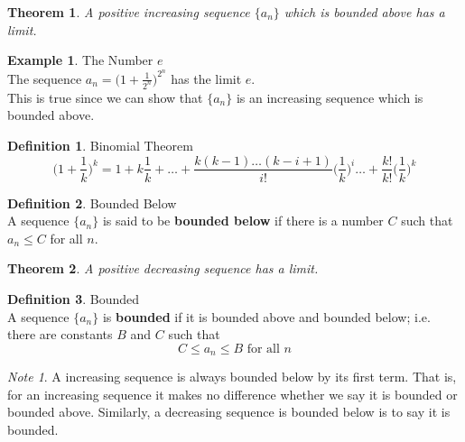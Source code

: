 \documentclass[10pt,a4paper,titlepage,twoside,draft]{article}
\theoremstyle{plain}
\newtheorem{thm}{Theorem}
\theoremstyle{definition}
\newtheorem{defn}{Definition}
\newtheorem{exmp}{Example}
\theoremstyle{remark}
\newtheorem{nt}{Note}
\begin{document}
\medskip

\begin{thm}
A positive increasing sequence $\{ a_{n} \}$ which is bounded above has a limit.
\end{thm}

\medskip

\begin{exmp}{The Number $e$} \\
The sequence $a_{n} = \bigg ( 1 + \frac{1}{2^{n}} \bigg)^{2^{n}}$ has the limit $e$. \\
This is true since we can show that $\{a_{n} \}$ is an increasing sequence which is bounded above.
\end{exmp}

\bigskip

\begin{defn}{Binomial Theorem} \\
\[ \bigg( 1+ \frac{1}{k} \bigg)^{k} = 1 + k \frac{1}{k} + \ldots + \frac{k(k-1) \ldots (k-i+1)}{i!} \bigg( \frac{1}{k} \bigg)^{i} \ldots + \frac{k!}{k!} \bigg( \frac{1}{k} \bigg)^{k} \]
\end{defn}

\medskip

\begin{defn}{Bounded Below} \\
A sequence $\{ a_{n} \}$ is said to be \textbf{bounded below} if there is a number $C$ such that $a_{n} \leq C$ for all $n$. 
\end{defn}

\smallskip

\begin{thm}
A positive decreasing sequence has a limit.
\end{thm}

\medskip 

\begin{defn}{Bounded} \\
A sequence $\{ a_{n} \}$ is \textbf{bounded} if it is bounded above and bounded below; i.e. there are constants $B$ and $C$ such that 
\[C \leq a_{n} \leq B \text{ for all } n \]
\end{defn}

\begin{nt}
A increasing sequence is always bounded below by its first term. 
That is, for an increasing sequence it makes no difference whether we say it is bounded or bounded above. 
Similarly, a decreasing sequence is bounded below is to say it is bounded. 
\end{nt}
\end{document}
